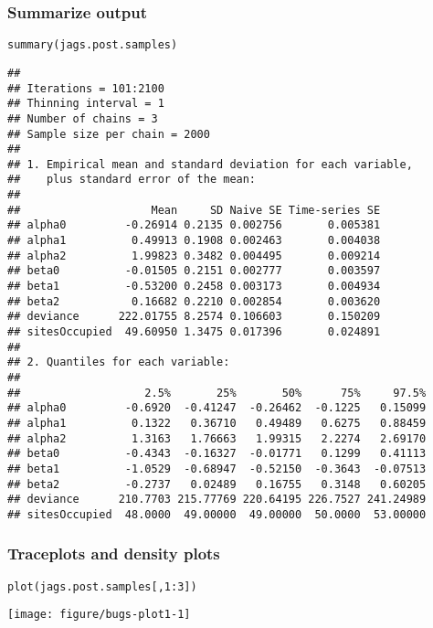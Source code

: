 \documentclass[color=usenames,dvipsnames]{beamer}\usepackage[]{graphicx}\usepackage[]{xcolor}
\makeatletter
\newcommand{\hlnum}[1]{\textcolor[rgb]{0.69,0.494,0}{#1}}%
\newcommand{\hlopt}[1]{\textcolor[rgb]{0,0,0}{#1}}%
\newcommand{\hldef}[1]{\textcolor[rgb]{0,0,0}{#1}}%
\newcommand{\hlkwd}[1]{\textcolor[rgb]{0.004,0.004,0.506}{#1}}%
\newenvironment{kframe}{%
 \def\at@end@of@kframe{}%
 \ifinner\ifhmode%
  \def\at@end@of@kframe{\end{minipage}}%
  \begin{minipage}{\columnwidth}%
 \fi\fi%
 \def\FrameCommand##1{\hskip\@totalleftmargin \hskip-\fboxsep
 \colorbox{shadecolor}{##1}\hskip-\fboxsep
     \hskip-\linewidth \hskip-\@totalleftmargin \hskip\columnwidth}%
 \MakeFramed {\advance\hsize-\width
   \@totalleftmargin\z@ \linewidth\hsize
   \@setminipage}}%
 {\par\unskip\endMakeFramed%
 \at@end@of@kframe}
\newenvironment{knitrout}{}{} %
\makeatother
\begin{document}
\begin{frame}[fragile]
  \frametitle{Summarize output}
\begin{knitrout}\tiny
{}\color{fgcolor}\begin{kframe}
\begin{alltt}
\hlkwd{summary}\hldef{(jags.post.samples)}
\end{alltt}
\begin{verbatim}
## 
## Iterations = 101:2100
## Thinning interval = 1 
## Number of chains = 3 
## Sample size per chain = 2000 
## 
## 1. Empirical mean and standard deviation for each variable,
##    plus standard error of the mean:
## 
##                    Mean     SD Naive SE Time-series SE
## alpha0         -0.26914 0.2135 0.002756       0.005381
## alpha1          0.49913 0.1908 0.002463       0.004038
## alpha2          1.99823 0.3482 0.004495       0.009214
## beta0          -0.01505 0.2151 0.002777       0.003597
## beta1          -0.53200 0.2458 0.003173       0.004934
## beta2           0.16682 0.2210 0.002854       0.003620
## deviance      222.01755 8.2574 0.106603       0.150209
## sitesOccupied  49.60950 1.3475 0.017396       0.024891
## 
## 2. Quantiles for each variable:
## 
##                   2.5%       25%       50%      75%     97.5%
## alpha0         -0.6920  -0.41247  -0.26462  -0.1225   0.15099
## alpha1          0.1322   0.36710   0.49489   0.6275   0.88459
## alpha2          1.3163   1.76663   1.99315   2.2274   2.69170
## beta0          -0.4343  -0.16327  -0.01771   0.1299   0.41113
## beta1          -1.0529  -0.68947  -0.52150  -0.3643  -0.07513
## beta2          -0.2737   0.02489   0.16755   0.3148   0.60205
## deviance      210.7703 215.77769 220.64195 226.7527 241.24989
## sitesOccupied  48.0000  49.00000  49.00000  50.0000  53.00000
\end{verbatim}
\end{kframe}
\end{knitrout}
\end{frame}




\begin{frame}[fragile]
  \frametitle{Traceplots and density plots}
\begin{knitrout}\footnotesize
{}\color{fgcolor}\begin{kframe}
\begin{alltt}
\hlkwd{plot}\hldef{(jags.post.samples[,}\hlnum{1}\hlopt{:}\hlnum{3}\hldef{])}
\end{alltt}
\end{kframe}

{\centering \texttt{[image: figure/bugs-plot1-1]} 

}


\end{knitrout}
\end{frame}
\end{document}
